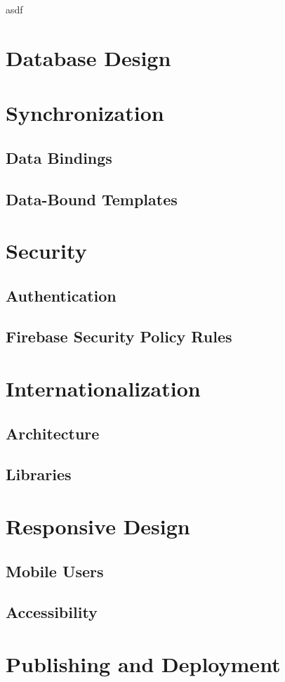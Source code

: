 asdf



\section{Database Design}
\label{sec:database}

\section{Synchronization}
\label{sec:sync}

\subsection{Data Bindings}
\label{sec:databindings}

\subsection{Data-Bound Templates}

\section{Security}
\label{sec:security}

\subsection{Authentication}

\subsection{Firebase Security Policy Rules}
\label{sec:security}

\section{Internationalization}
\label{sec:i18n}

\subsection{Architecture}
\subsection{Libraries}

\section{Responsive Design}
\label{sec:responsive}

\subsection{Mobile Users}

\subsection{Accessibility}

\section{Publishing and Deployment}
\label{publishing}
